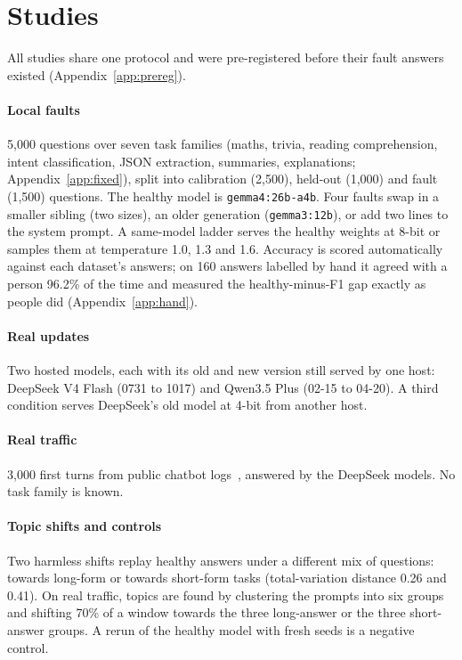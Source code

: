 \documentclass{article}
\begin{document}
\section{Studies}
\label{sec:setup}

All studies share one protocol and were pre-registered before their fault answers
existed (Appendix~\ref{app:prereg}).

\paragraph{Local faults} 5{,}000 questions over seven task families (maths,
trivia, reading comprehension, intent classification, JSON extraction, summaries,
explanations; Appendix~\ref{app:fixed}), split into calibration (2{,}500), held-out
(1{,}000) and fault (1{,}500) questions. The healthy model is
\texttt{gemma4:26b-a4b}. Four faults swap in a smaller sibling (two sizes), an
older generation (\texttt{gemma3:12b}), or add two lines to the system prompt. A
same-model ladder serves the healthy weights at 8-bit or samples them at
temperature 1.0, 1.3 and 1.6. Accuracy is scored automatically against each
dataset's answers; on 160 answers labelled by hand it agreed with a person 96.2\%
of the time and measured the healthy-minus-F1 gap exactly as people did
(Appendix~\ref{app:hand}).

\paragraph{Real updates} Two hosted models, each with its old and new version
still served by one host: DeepSeek V4 Flash (0731 to 1017) and
Qwen3.5 Plus (02-15 to 04-20). A third condition serves DeepSeek's old model at
4-bit from another host.

\paragraph{Real traffic} 3{,}000 first turns from public chatbot
logs~\citep{zhao2024wildchat}, answered by the DeepSeek models. No task family is
known.

\paragraph{Topic shifts and controls} Two harmless shifts replay healthy answers
under a different mix of questions: towards long-form or towards short-form tasks
(total-variation distance 0.26 and 0.41). On real traffic, topics are found by
clustering the prompts into six groups and shifting 70\% of a window towards the
three long-answer or the three short-answer groups. A rerun of the healthy model
with fresh seeds is a negative control.
\end{document}
